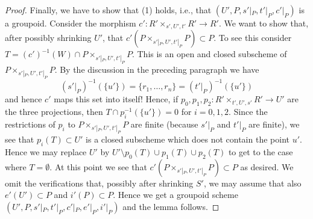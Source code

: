 \begin{proof}
\medskip\noindent
Finally, we have to show that (1) holds, i.e., that
$(U', P, s'|_P, t'|_P, c'|_P)$ is a groupoid.
Consider the morphism $c' : R' \times_{s', U', t'} R' \to R'$.
We want to show that, after possibly shrinking $U'$, that
$c'(P \times_{s'|_P, U', t'|_P} P) \subset P$. To see this
consider $T = (c')^{-1}(W) \cap P \times_{s'|_P, U', t'|_P} P$.
This is an open and closed subscheme of $P \times_{s'|_P, U', t'|_P} P$.
By the discussion in the preceding paragraph we have
$$
(s'|_P)^{-1}(\{u'\}) = \{r_1, \ldots, r_n\} = (t'|_P)^{-1}(\{u'\})
$$
and hence $c'$ maps this set into itself! Hence, if
$p_0, p_1, p_2: R' \times_{t',U',s'} R' \rightarrow U'$ are
the three projections, then $T \cap p_i^{-1}(\{u'\}) = 0$ for $i = 0, 1, 2$.
Since the restrictions of $p_i$ to $P \times_{s'|_P, U', t'|_P} P$ are finite
(because $s'|_P$ and $t'|_P$ are finite), we see that $p_i(T) \subset U'$
is a closed subscheme which does not contain the point $u'$.
Hence we may replace $U'$ by $U' \setminus p_0(T) \cup p_1(T) \cup p_2(T)$
to get to the case where $T = \emptyset$. At this point
we see that $c'(P \times_{s'|_P, U', t'|_P} P) \subset P$
as desired. We omit the verifications that, possibly after shrinking $S'$,
we may assume that also $e'(U') \subset P$ and $i'(P) \subset P$.
Hence we get a groupoid scheme $(U', P, s'|_P, t'|_P, c'|_P, e'|_P, i'|_P)$
and the lemma follows.
\end{proof}






























